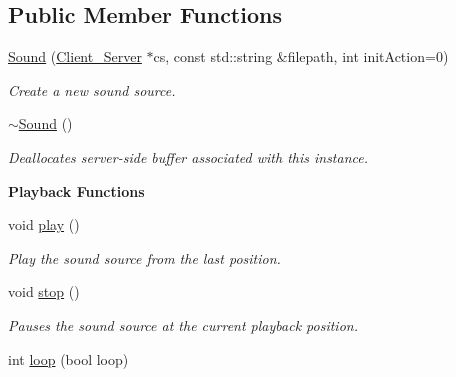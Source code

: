 \subsection*{Public Member Functions}
\begin{DoxyCompactItemize}
\item 
\hypertarget{classColliderPlusPlus_1_1Sound_a23a0354075aceeddb8ea4bf69631e4f8}{\hyperlink{classColliderPlusPlus_1_1Sound_a23a0354075aceeddb8ea4bf69631e4f8}{Sound} (\hyperlink{classColliderPlusPlus_1_1Client__Server}{Client\-\_\-\-Server} $\ast$cs, const std\-::string \&filepath, int init\-Action=0)}\label{classColliderPlusPlus_1_1Sound_a23a0354075aceeddb8ea4bf69631e4f8}

\begin{DoxyCompactList}\small\item\em Create a new sound source. \end{DoxyCompactList}\item 
\hypertarget{classColliderPlusPlus_1_1Sound_a0ae9f80837e343e016952def28815072}{\hyperlink{classColliderPlusPlus_1_1Sound_a0ae9f80837e343e016952def28815072}{$\sim$\-Sound} ()}\label{classColliderPlusPlus_1_1Sound_a0ae9f80837e343e016952def28815072}

\begin{DoxyCompactList}\small\item\em Deallocates server-\/side buffer associated with this instance. \end{DoxyCompactList}\end{DoxyCompactItemize}
\begin{Indent}{\bf Playback Functions}\par
\begin{DoxyCompactItemize}
\item 
\hypertarget{classColliderPlusPlus_1_1Sound_a555d34089f5c74363b837ffaf4a66c45}{void \hyperlink{classColliderPlusPlus_1_1Sound_a555d34089f5c74363b837ffaf4a66c45}{play} ()}\label{classColliderPlusPlus_1_1Sound_a555d34089f5c74363b837ffaf4a66c45}

\begin{DoxyCompactList}\small\item\em Play the sound source from the last position. \end{DoxyCompactList}\item 
\hypertarget{classColliderPlusPlus_1_1Sound_a7010e6bcdd47d51b359c364883574a5d}{void \hyperlink{classColliderPlusPlus_1_1Sound_a7010e6bcdd47d51b359c364883574a5d}{stop} ()}\label{classColliderPlusPlus_1_1Sound_a7010e6bcdd47d51b359c364883574a5d}

\begin{DoxyCompactList}\small\item\em Pauses the sound source at the current playback position. \end{DoxyCompactList}\item 
int \hyperlink{classColliderPlusPlus_1_1Sound_aad17d4b990faae4cf90c281e33d06155}{loop} (bool loop)
\end{DoxyCompactItemize}
\end{Indent}



